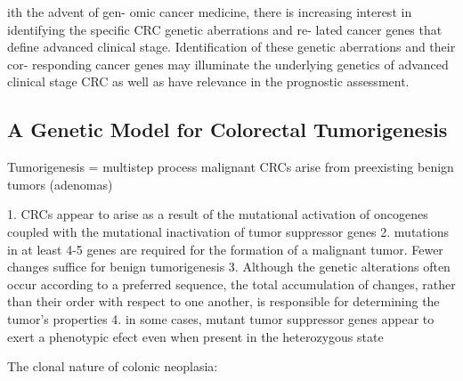   ith the advent of gen- omic cancer medicine, there is increasing interest in
  identifying the specific CRC genetic aberrations and re- lated cancer genes
  that define advanced clinical stage. Identification of these genetic
  aberrations and their cor- responding cancer genes may illuminate the
  underlying genetics of advanced clinical stage CRC as well as have relevance
  in the prognostic assessment.


\subsection{A Genetic Model for Colorectal Tumorigenesis}

  Tumorigenesis = multistep process
  malignant CRCs arise from preexisting benign tumors (adenomas)

  1. CRCs appear to arise as a result of the mutational activation of oncogenes
      coupled with the mutational inactivation of tumor suppressor genes
  2. mutations in at least 4-5 genes are required for the formation of a
      malignant tumor. Fewer changes suffice for benign tumorigenesis
  3. Although the genetic alterations often occur according to a preferred
      sequence, the total accumulation of changes, rather than their order with
      respect to one another, is responsible for determining the tumor's properties
  4. in some cases, mutant tumor suppressor genes appear to exert a phenotypic
      efect even when present in the heterozygous state

  The clonal nature of colonic neoplasia:
